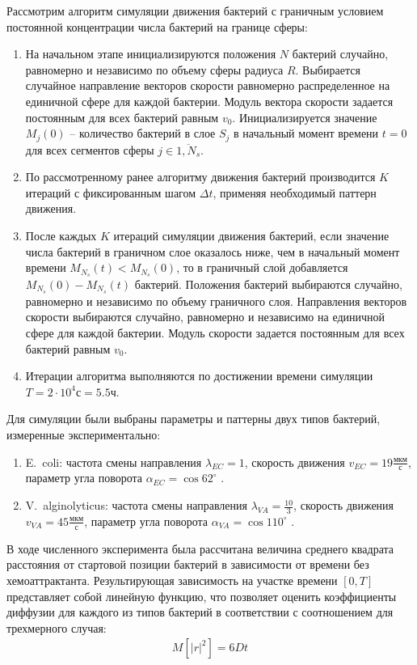 Рассмотрим алгоритм симуляции движения бактерий с граничным условием постоянной концентрации числа бактерий на границе сферы:
\begin{enumerate}
    \item На начальном этапе инициализируются положения $N$ бактерий случайно, равномерно и независимо по объему сферы радиуса $R$. Выбирается случайное направление векторов скорости равномерно распределенное на единичной сфере для каждой бактерии. Модуль вектора скорости задается постоянным для всех бактерий равным $v_0$. Инициализируется значение $M_j (0)$ -- количество бактерий в слое $S_j$ в начальный момент времени $t=0$ для всех сегментов сферы $j \in \overline{1,N_s}$.
    \item По рассмотренному ранее алгоритму движения бактерий производится $K$ итераций с фиксированным шагом $\Delta t$, применяя необходимый паттерн движения.
    \item После каждых $K$ итераций симуляции движения бактерий, если значение числа бактерий в граничном слое оказалось ниже, чем в начальный момент времени $M_{N_s}(t) < M_{N_s}(0)$, то в граничный слой добавляется $M_{N_s}(0) - M_{N_s}(t)$ бактерий. Положения бактерий выбираются случайно, равномерно и независимо по объему граничного слоя. Направления векторов скорости выбираются случайно, равномерно и независимо на единичной сфере для каждой бактерии. Модуль скорости задается постоянным для всех бактерий равным $v_0$.
    \item Итерации алгоритма выполняются по достижении времени симуляции $T = 2 \cdot 10^4 \textrm{с} = 5.5 \textrm{ч}$.
\end{enumerate}

Для симуляции были выбраны параметры и паттерны двух типов бактерий, измеренные экспериментально: 
\begin{enumerate}
    \item E.~coli: частота смены направления $\lambda_{EC}=1$, скорость движения $v_{EC}=19 \frac{\textrm{мкм}}{\textrm{с}}$, параметр угла поворота $\alpha_{EC}=\cos 62^\circ$ \cite{berg_chemotaxis_1972}.
    \item V.~alginolyticus: частота смены направления $\lambda_{VA}=\frac{10}{3}$, скорость движения $v_{VA}=45 \frac{\textrm{мкм}}{\textrm{с}}$, параметр угла поворота $\alpha_{VA}=\cos 110^\circ$ \cite{xie_bacterial_2011}.
\end{enumerate}


В ходе численного эксперимента была рассчитана величина среднего квадрата расстояния от стартовой позиции бактерий в зависимости от времени без хемоаттрактанта. Результирующая зависимость на участке времени $[0, T]$ представляет собой линейную функцию, что позволяет оценить коэффициенты диффузии для каждого из типов бактерий в соответствии с соотношением для трехмерного случая:
\begin{equation}
    \begin{aligned}
        M[|r|^2]=6Dt
    \label{eq:msd}
    \end{aligned}
\end{equation}


